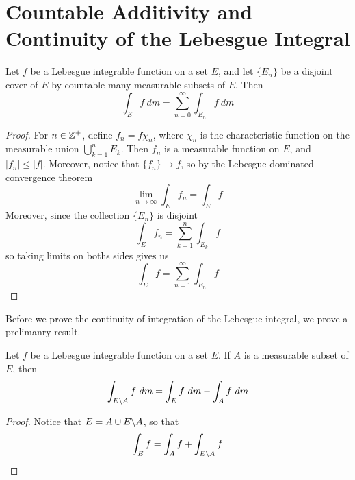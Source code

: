 \section{Countable Additivity and Continuity of the Lebesgue Integral}

\begin{theorem}\label{10.4.1}
    Let $f$ be a Lebesgue integrable function on a set  $E$, and let $\{E_n\}$
    be a disjoint cover of $E$ by countable many measurable subsets of  $E$. Then
    \begin{equation*}
        \int_E{f \ dm}=\sum_{n=0}^\infty{\int_{E_n}{f \ dm}}
    \end{equation*}
\end{theorem}
\begin{proof}
    For $n \in \mathbb{Z}^+$, define  $f_n=f\chi_n$, where $\chi_n$ is the
    characteristic function on the measurable union  $\bigcup_{k=1}^{n}{E_k}$.
    Then $f_n$ is a measurable function on  $E$, and  $|f_n| \leq |f|$. Moreover,
    notice that  $\{f_n\} \xrightarrow{} f$, so by the Lebesgue dominated
    convergence theorem
    \begin{equation*}
        \lim_{n \xrightarrow{} \infty}{\int_E{f_n}}=\int_E{f}
    \end{equation*}
    Moreover, since the collection $\{E_n\}$ is disjoint
    \begin{equation*}
        \int_E{f_n}=\sum_{k=1}^n{\int_{E_k}}{f}
    \end{equation*}
    so taking limits on boths sides gives us
    \begin{equation*}
        \int_E{f}=\sum_{n=1}^\infty{\int_{E_n}{f}}
    \end{equation*}
\end{proof}

Before we prove the continuity of integration of the Lebesgue integral, we prove
a prelimanry result.

\begin{lemma}\label{10.4.2}
    Let $f$ be a Lebesgue integrable function on a set $E$. If $A$ is a
    measurable subset of  $E$, then
    \begin{equation*}
        \int_{\com{E}{A}}{f \ dm}=\int_E{f \ dm}-\int_A{f \ dm}
    \end{equation*}
\end{lemma}
\begin{proof}
    Notice that $E=A \cup E \backslash A$, so that
    \begin{equation*}
        \int_E{f}=\int_A{f}+\int_{E \backslash A}{f}
    \end{equation*}
\end{proof}

